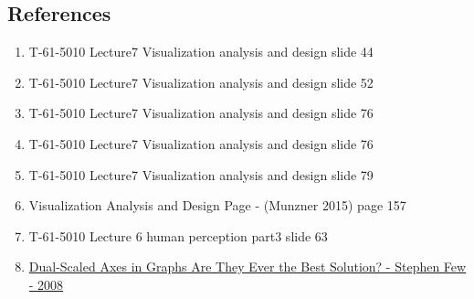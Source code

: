 \documentclass[a4paper,11pt]{article}
\begin{document}
\begin{multicols}{2}
\section*{References}
\begin{enumerate}
	\item T-61-5010 Lecture7 Visualization analysis and design slide 44 \label{1}
	\item T-61-5010 Lecture7 Visualization analysis and design slide 52 \label{2}
	\item T-61-5010 Lecture7 Visualization analysis and design slide 76 \label{3}
	\item T-61-5010 Lecture7 Visualization analysis and design slide 76 \label{4}
	\item T-61-5010 Lecture7 Visualization analysis and design slide 79 \label{5}
	\item Visualization Analysis and Design Page - (Munzner 2015) page 157 \label{6}
	\item T-61-5010 Lecture 6 human perception part3 slide 63 \label{7}
	\item \href{http://www.perceptualedge.com/articles/visual_business_intelligence/dual-scaled_axes.pdf}{Dual-Scaled Axes in Graphs
		Are They Ever the Best Solution? - Stephen Few - 2008} \label{8}
\end{enumerate}
\end{multicols}
\end{document}
